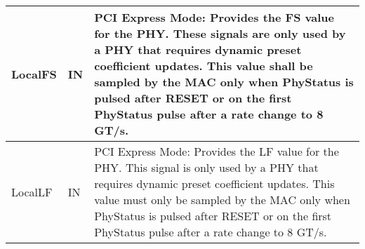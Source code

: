 \begin{table}[H]
\begin{tabular}{ |P{60mm}|P{10mm}|m{60mm}|  }
LocalFS \newline [6*LANESNUMBER -1:0] & IN & 
PCI Express Mode: \newline
Provides the FS value for the PHY. These
signals are only used by a PHY that requires
dynamic preset coefficient updates. \newline
This value shall be sampled by the MAC only
when PhyStatus is pulsed after RESET or on
the first PhyStatus pulse after a rate change to
8 GT/s.
\\ \hline

LocalLF \newline [6*LANESNUMBER -1:0] & IN & 

PCI Express Mode: \newline 
Provides the LF value for the PHY. This
signal is only used by a PHY that requires
dynamic preset coefficient updates. 
This value must only be sampled by the MAC
only when PhyStatus is pulsed after RESET
or on the first PhyStatus pulse after a rate
change to 8 GT/s.
\\ \hline




\end{tabular}
\end{table}


